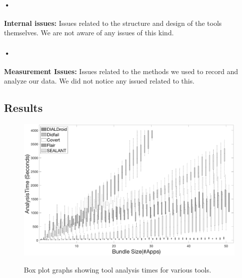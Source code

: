\documentclass[twocolumn]{article}
\begin{document}
\paragraph{•}
	\textbf{Internal issues:} Issues related to the structure and design of the tools themselves. We are not aware of any issues of this kind.
\paragraph{•}
	\textbf{Measurement Issues:} Issues related to the methods we used to record and analyze our data. We did not notice any issued related to this.
	
\clearpage
\newpage

\subsection{Results}

\begin{figure}[!ht]

\centering
	\includegraphics[width=\linewidth]{BoxPlotGraph}
	\label{figure:1}
	\caption{Box plot graphs showing tool analysis times for various tools.}
\end{figure}
\end{document}
